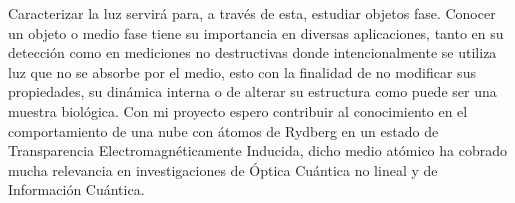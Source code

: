 \p Caracterizar la luz servirá para, a través de esta, estudiar objetos fase. Conocer un objeto o medio fase tiene su importancia en diversas aplicaciones, tanto en su detección como en mediciones no destructivas donde intencionalmente se utiliza luz que no se absorbe por el medio, esto con la finalidad de no modificar sus propiedades, su dinámica interna o de alterar su estructura como puede ser una muestra biológica. Con mi proyecto espero contribuir al conocimiento en el comportamiento de una nube con átomos de Rydberg en un estado de Transparencia Electromagnéticamente Inducida, dicho medio atómico ha cobrado mucha relevancia en investigaciones de Óptica Cuántica no lineal y de Información Cuántica.
